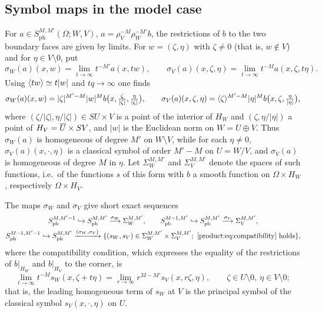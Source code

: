 \subsection{Symbol maps in the model case}
For $a\in S^{M,M'}_{\mathrm{ph}}(\Omega;W,V)$, $a=\rho_V^{-M}\rho_W^{-M'}b$, the
restrictions of $b$ to the two boundary faces are given by limits. For $w=(\zeta,\eta)$
with $\zeta\ne0$ (that is, $w\notin V$) and for $\eta\in V\setminus0$, put
\begin{equation}\label{product:eq:model-symbols}
\sigma_W(a)(x,w)=\lim_{t\to\infty}t^{-M'}a(x,tw),\qquad
\sigma_V(a)(x,\zeta,\eta)=\lim_{t\to\infty}t^{-M}a(x,\zeta,t\eta).
\end{equation}
Using $\langle tw\rangle\simeq t|w|$ and $tq\to\infty$ one finds
\begin{equation*}
\sigma_W(a)(x,w)=|\zeta|^{M'-M}|w|^Mb\big(x,\tfrac\zeta{|\zeta|},\tfrac\eta{|\zeta|}\big),\qquad
\sigma_V(a)(x,\zeta,\eta)=\langle \zeta\rangle^{M'-M}|\eta|^Mb\big(x,\zeta,\tfrac\eta{|\eta|}\big),
\end{equation*}
where $(\zeta/|\zeta|,\eta/|\zeta|)\in SU\times V$ is a point of the interior of
$H_W$ and $(\zeta,\eta/|\eta|)$ a point of $H_V=\overline{U}\times SV$, and $|w|$ is the
Euclidean norm on $W=U\oplus V$. Thus $\sigma_W(a)$ is homogeneous of degree $M'$
on $W\setminus V$, while for each $\eta\ne0$, $\sigma_V(a)(x,\cdot,\eta)$ is a
classical symbol of order $M'-M$ on $U=W/V$, and $\sigma_V(a)$ is homogeneous of
degree $M$ in $\eta$. Let $\Sigma_W^{M,M'}$ and $\Sigma_V^{M,M'}$ denote the
spaces of such functions, i.e.\ of the functions $s$ of this form with $b$ a
smooth function on $\Omega\times H_W$, respectively $\Omega\times H_V$.

\begin{lemma}\label{product:lem:model-symbol-maps}
The maps $\sigma_W$ and $\sigma_V$ give short exact sequences
\begin{gather*}
S^{M,M'-1}_{\mathrm{ph}}\hookrightarrow S^{M,M'}_{\mathrm{ph}}\overset{\sigma_W}
\longrightarrow\Sigma_W^{M,M'},\qquad
S^{M-1,M'}_{\mathrm{ph}}\hookrightarrow S^{M,M'}_{\mathrm{ph}}\overset{\sigma_V}
\longrightarrow\Sigma_V^{M,M'},\\
S^{M-1,M'-1}_{\mathrm{ph}}\hookrightarrow S^{M,M'}_{\mathrm{ph}}
\xrightarrow{(\sigma_W,\sigma_V)}\{(s_W,s_V)\in\Sigma_W^{M,M'}\times\Sigma_V^{M,M'};
\ \text{\eqref{product:eq:compatibility} holds}\},
\end{gather*}
where the compatibility condition, which expresses the equality of the restrictions
of $b|_{H_W}$ and $b|_{H_V}$ to the corner, is
\begin{equation}\label{product:eq:compatibility}
\lim_{t\to\infty}t^{-M}s_W(x,\zeta+t\eta)=\lim_{r\to\infty}r^{M-M'}s_V(x,r\zeta,\eta),
\qquad\zeta\in U\setminus0,\ \eta\in V\setminus0;
\end{equation}
that is, the leading homogeneous term of $s_W$ at $V$ is the principal symbol of
the classical symbol $s_V(x,\cdot,\eta)$ on $U$.
\end{lemma}

